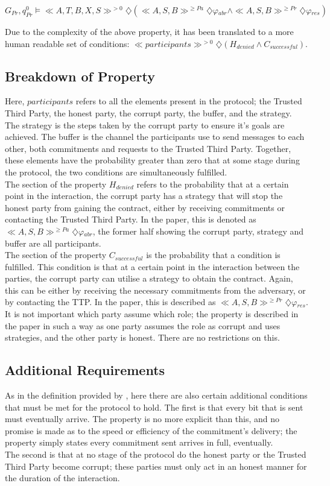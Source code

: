 \documentclass{l4proj}
\begin{document}
\centerline{$ G{_{Pr}},q_{Pr}^{0}\models  \ll A, T, B, X, S \gg ^{>0} \diamondsuit (\ll A, S, B \gg^{\ge Pa} \diamondsuit \varphi{_{abr}}  \wedge \ll A, S, B \gg^{\ge Pr} \diamondsuit \varphi{_{res}}) $}

Due to the complexity of the above property, it has been translated to a more human readable set of conditions:
$\ll participants \gg ^{>0} \diamondsuit (H_{denied}  \wedge C_{successful})$.


\subsection{Breakdown of Property}
Here, $participants$ refers to all the elements present in the protocol; the Trusted Third Party, the honest party, the corrupt party, the buffer, and the strategy. The strategy is the steps taken by the corrupt party to ensure it's goals are achieved. The buffer is the channel the participants use to send messages to each other, both commitments and requests to the Trusted Third Party. Together, these elements have the probability greater than zero that at some stage during the protocol, the two conditions are simultaneously fulfilled.\\
The section of the property $H_{denied}$ refers to the probability that at a certain point in the interaction, the corrupt party has a strategy that will stop the honest party from gaining the contract, either by receiving commitments or contacting the Trusted Third Party. In the paper, this is denoted as  $\ll A, S, B \gg^{\ge Pa} \diamondsuit \varphi{_{abr}}$, the former half showing the corrupt party, strategy and buffer are all participants. \\
The section of the property $C_{successful}$ is the probability that a condition is fulfilled. This condition is that at a certain point in the interaction between the parties, the corrupt party can utilise a strategy to obtain the contract. Again, this can be either by receiving the necessary commitments from the adversary, or by contacting the TTP. In the paper, this is described as $\ll A, S, B \gg^{\ge Pr} \diamondsuit \varphi{_{res}}$. \\
It is not important which party assume which role; the property is described in the paper in such a way as one party assumes the role as corrupt and uses strategies, and the other party is honest. There are no restrictions on this.
\subsection{Additional Requirements}
As in the definition provided by \cite{chadha2001inductive}, here there are also certain additional conditions that must be met for the protocol to hold. The first is that every bit that is sent must eventually arrive. The property is no more explicit than this, and no promise is made as to the speed or efficiency of the commitment's delivery; the property simply states every commitment sent arrives in full, eventually.\\
The second is that at no stage of the protocol do the honest party or the Trusted Third Party become corrupt; these parties must only act in an honest manner for the duration of the interaction.
\end{document}
